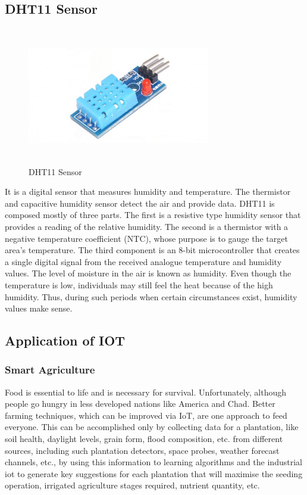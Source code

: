 \documentclass[12pt,a4paper,twocolumn,fleqn]{article}
\begin{document}
\subsection{DHT11 Sensor}
\begin{figure} [H]
\includegraphics[width=8cm,height=6cm]{media/DHT11module.jpg}
\centering
\caption{DHT11 Sensor}
\end{figure}
It is a digital sensor that measures humidity and temperature. The thermistor and capacitive humidity sensor detect the air and provide data. DHT11 is composed mostly of three parts. The first is a resistive type humidity sensor that provides a reading of the relative humidity. The second is a thermistor with a negative temperature coefficient (NTC), whose purpose is to gauge the target area's temperature. The third component is an 8-bit microcontroller that creates a single digital signal from the received analogue temperature and humidity values. The level of moisture in the air is known as humidity. Even though the temperature is low, individuals may still feel the heat because of the high humidity. Thus, during such periods when certain circumstances exist, humidity values make sense.
\\
\subsection{Application of IOT}
\subsubsection{Smart Agriculture}
Food is essential to life and is necessary for survival. Unfortunately, although people go hungry in less developed nations like America and Chad. Better farming techniques, which can be improved via IoT, are one approach to feed everyone. This can be accomplished only by collecting data for a plantation, like soil health, daylight levels, grain form, flood composition, etc. from different sources, including such plantation detectors, space probes, weather forecast channels, etc., by using this information to learning algorithms and the industrial iot to generate key suggestions for each plantation that will maximise the seeding operation, irrigated agriculture stages required, nutrient quantity, etc.
\end{document}
